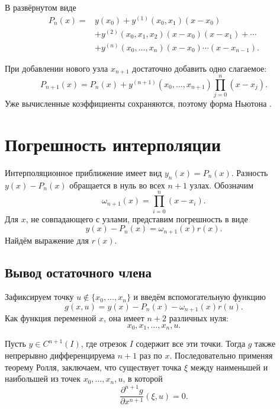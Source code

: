 \documentclass[../final.tex]{subfiles}
\begin{document}
В развёрнутом виде
%
\begin{align*}
    P_n(x)={}&y(x_0)+y^{(1)}(x_0,x_1)(x-x_0)\\
    &+y^{(2)}(x_0,x_1,x_2)(x-x_0)(x-x_1)+\cdots\\
    &+y^{(n)}(x_0,\ldots,x_n)(x-x_0)\cdots(x-x_{n-1}).
\end{align*}

При добавлении нового узла $x_{n+1}$ достаточно добавить одно слагаемое:
%
\begin{equation*}
    P_{n+1}(x)=P_n(x)+y^{(n+1)}(x_0,\ldots,x_{n+1})
    \prod_{j=0}^{n}(x-x_j).
\end{equation*}
%
Уже вычисленные коэффициенты сохраняются, поэтому форма Ньютона
.

\section{Погрешность интерполяции}

Интерполяционное приближение имеет вид $y_n(x)=P_n(x)$.
Разность $y(x)-P_n(x)$ обращается в нуль во всех $n+1$ узлах.
Обозначим
%
\begin{equation*}
    \omega_{n+1}(x)=\prod_{i=0}^{n}(x-x_i).
\end{equation*}
%
Для $x$, не совпадающего с узлами, представим погрешность в виде
%
\begin{equation*}
    y(x)-P_n(x)=\omega_{n+1}(x)r(x).
\end{equation*}
%
Найдём выражение для $r(x)$.

\subsection{Вывод остаточного члена}

Зафиксируем точку $u\notin\{x_0,\ldots,x_n\}$ и введём вспомогательную функцию
%
\begin{equation*}
    g(x,u)=y(x)-P_n(x)-\omega_{n+1}(x)r(u).
\end{equation*}
%
Как функция переменной $x$, она имеет $n+2$ различных нуля:
%
\begin{equation*}
    x_0,x_1,\ldots,x_n,u.
\end{equation*}

Пусть $y\in C^{n+1}(I)$, где отрезок $I$ содержит все эти точки.
Тогда $g$ также непрерывно дифференцируема $n+1$ раз по $x$.
Последовательно применяя теорему Ролля, заключаем, что существует
точка $\xi$ между наименьшей и наибольшей из точек
$x_0,\ldots,x_n,u$, в которой
%
\begin{equation*}
    \frac{\partial^{n+1}g}{\partial x^{n+1}}(\xi,u)=0.
\end{equation*}
\end{document}
